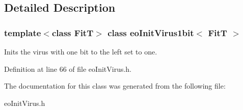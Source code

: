 \subsection{Detailed Description}
\subsubsection*{template$<$class Fit\-T$>$ class eo\-Init\-Virus1bit$<$ Fit\-T $>$}

Inits the virus with one bit to the left set to one. 



Definition at line 66 of file eo\-Init\-Virus.h.

The documentation for this class was generated from the following file:\begin{CompactItemize}
\item 
eo\-Init\-Virus.h\end{CompactItemize}
